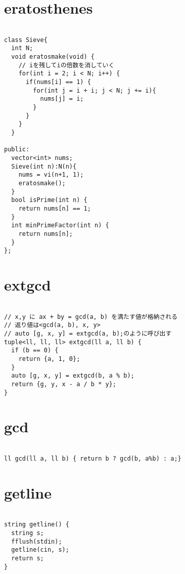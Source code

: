 \documentclass[a4j,titlepage]{jarticle} %
\begin{document}
\color{white}
\section{eratosthenes}
\color{black}
\begin{lstlisting}[caption=eratosthenes]

class Sieve{
  int N;
  void eratosmake(void) {
    // iを残してiの倍数を消していく
    for(int i = 2; i < N; i++) {
      if(nums[i] == 1) {
        for(int j = i + i; j < N; j += i){
          nums[j] = i;
        }
      }
    }
  }

public:
  vector<int> nums;
  Sieve(int n):N(n){
    nums = vi(n+1, 1);
    eratosmake();
  }
  bool isPrime(int n) {
    return nums[n] == 1;
  }
  int minPrimeFactor(int n) {
    return nums[n];
  }
};

\end{lstlisting}

\color{white}
\section{extgcd}
\color{black}
\begin{lstlisting}[caption=extgcd]

// x,y に ax + by = gcd(a, b) を満たす値が格納される
// 返り値は<gcd(a, b), x, y>
// auto [g, x, y] = extgcd(a, b);のように呼び出す
tuple<ll, ll, ll> extgcd(ll a, ll b) {
  if (b == 0) {
    return {a, 1, 0};
  }
  auto [g, x, y] = extgcd(b, a % b);
  return {g, y, x - a / b * y};
}

\end{lstlisting}

\color{white}
\section{gcd}
\color{black}
\begin{lstlisting}[caption=gcd]

ll gcd(ll a, ll b) { return b ? gcd(b, a%b) : a;}

\end{lstlisting}

\color{white}
\section{getline}
\color{black}
\begin{lstlisting}[caption=getline]

string getline() {
  string s;
  fflush(stdin);
  getline(cin, s);
  return s;
}

\end{lstlisting}
\end{document}

